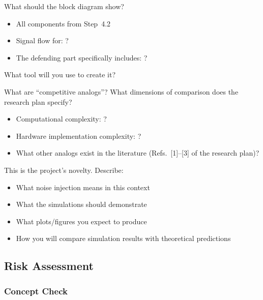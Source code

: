 What should the block diagram show?
\begin{itemize}[nosep]
  \item All components from Step~4.2
  \item Signal flow for: ?
  \item The defending part specifically includes: ?
\end{itemize}
What tool will you use to create it?

\begin{answerbox}\end{answerbox}

What are ``competitive analogs''? What dimensions of comparison does the research plan specify?
\begin{itemize}[nosep]
  \item Computational complexity: ?
  \item Hardware implementation complexity: ?
  \item What other analogs exist in the literature (Refs.~[1]--[3] of the research plan)?
\end{itemize}

\begin{answerbox}\end{answerbox}

This is the project's novelty. Describe:
\begin{itemize}[nosep]
  \item What noise injection means in this context
  \item What the simulations should demonstrate
  \item What plots/figures you expect to produce
  \item How you will compare simulation results with theoretical predictions
\end{itemize}

\begin{largeanswer}\end{largeanswer}

\subsection{Risk Assessment}

\subsubsection*{Concept Check}

